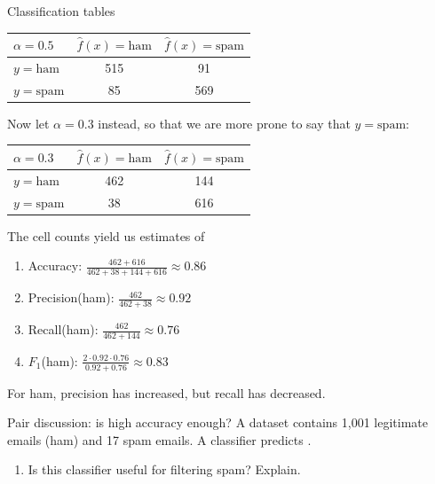 \documentclass[10pt]{beamer}
\begin{document}
\begin{frame}{Classification tables}

\begin{center}
\begin{tabular}{ l | c | c }
 {\color{uured}$\alpha=0.5$} & $\hat{f}(x)=\text{ham}$ & $\hat{f}(x)=\text{spam}$\\
  \hline
  $y=\text{ham}$ & 515 & 91 \\
  $y=\text{spam}$ & 85 & 569 \\
  \hline
\end{tabular}
\end{center}
\pause
Now let $\alpha=0.3$ instead, so that we are more prone to say that $\hat{y}=\text{spam}$:
\begin{center}
\begin{tabular}{ l | c | c }
  {\color{uured}$\alpha=0.3$} & $\hat{f}(x)=\text{ham}$ & $\hat{f}(x)=\text{spam}$\\
  \hline
  $y=\text{ham}$ & 462 & 144 \\
  $y=\text{spam}$ & 38 & 616 \\
  \hline
\end{tabular}
\end{center}
The cell counts yield us estimates of
\begin{enumerate}
\item Accuracy: $\frac{462+616}{462+38+144+616}\approx 0.86$
\item Precision(ham): $\frac{462}{462+38}\approx 0.92$
\item Recall(ham): $\frac{462}{462+144}\approx 0.76$
\item $F_1$(ham): $\frac{2 \cdot 0.92 \cdot 0.76}{0.92 + 0.76}\approx 0.83$
\end{enumerate}

For ham, precision has increased, but recall has decreased.

\end{frame}





\begin{frame}{Pair discussion: is high accuracy enough?}
A dataset contains 1,001 legitimate emails (ham) and 17 spam emails. A classifier predicts .

\begin{enumerate}
\item Is this classifier useful for filtering spam? Explain.
\end{enumerate}
\end{frame}
\end{document}
